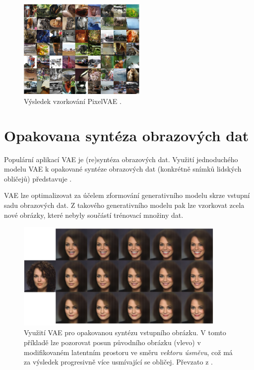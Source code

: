\begin{figure}[H]
    \centering
    \includegraphics[width=0.55\textwidth]{figures/applications/image_net_pixel_vae_gulrajani.png}
    \caption{Výsledek vzorkování PixelVAE \cite{Gulrajani2016}.}
    \label{fig:image_net_pixel_vae_gulrajani}
\end{figure}

\newpage
\section{Opakovana syntéza obrazových dat}
Populární aplikací VAE je (re)syntéza obrazových dat.
Využití jednoduchého modelu VAE k opakované syntéze obrazových dat (konkrétně snímků lidských obličejů) představuje \cite{White2016}.

VAE lze optimalizovat za účelem zformování generativního modelu skrze vstupní sadu obrazových dat.
Z takového generativního modelu pak lze vzorkovat zcela nové obrázky, které nebyly součástí trénovací množiny dat. \cite{Kingma2019}

\begin{figure}[H]
    \centering
    \includegraphics[width=0.9\textwidth]{figures/applications/vae_smile_vector_white.png}
    \caption{Využití VAE pro opakovanou syntézu vstupního obrázku. V tomto příkladě lze pozorovat posun původního obrázku (vlevo) v modifikovaném latentním prostoru ve směru \emph{vektoru úsměvu}, což má za výsledek progresivně více usmívající se obličej. Převzato z \cite{White2016}.}
    \label{fig:vae_smile_vector_white}
\end{figure}


